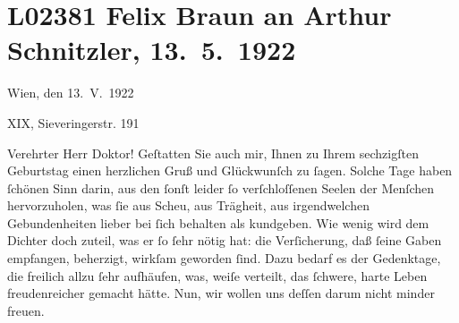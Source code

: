 

\section[Felix Braun an Arthur Schnitzler, 13. 5. 1922]{L02381 Felix Braun an Arthur Schnitzler, 13. 5. 1922}
\nopagebreak{}
\rehead{ }\normalsize\beginnumbering{}
\toendnotes[C]{\smallbreak\pagebreak[2]}
\toendnotes[C]{\smallbreak}
\toendnotes[C]{\smallbreak}
\pstart
           \raggedleft{}{\pb}Wien, den 13. V. 1922\pend
           
\pstart
           \raggedleft{}XIX, Sieveringerstr. 191\pend
           
\pstart{}Verehrter Herr Doktor!\pend\vspace{0.5em}
\pstart
           Geſtatten Sie auch mir, Ihnen zu Ihrem sechzigſten Geburtstag einen herzlichen Gruß
               und Glückwunſch zu{ }ſagen. Solche Tage haben \label{T_L02381-1v}\label{T_L02381-1}{ }ſchönen Sinn darin, aus den{ }ſonſt
               leider{ }ſo verſchloſſenen Seelen der Menſchen hervorzuholen, was{ }ſie aus Scheu, aus
               Trägheit, aus irgendwelchen Gebundenheiten lieber bei{ }ſich behalten als kundgeben.
               Wie wenig wird dem Dichter doch zuteil, was er{ }ſo{ }ſehr nötig hat: die Verſicherung,
               daß{ }ſeine Gaben empfangen, beherzigt, wirkſam geworden{ }ſind. Dazu bedarf es der
               Gedenktage, die freilich allzu{ }ſehr aufhäufen, was, weiſe verteilt, das{ }ſchwere,
               harte Leben freudenreicher gemacht hätte. Nun, wir wollen uns deſſen darum nicht
               minder freuen.\pend
           
